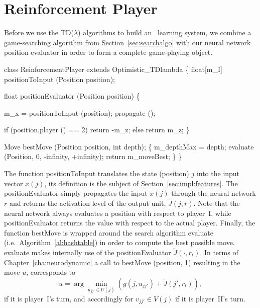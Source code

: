 \section{Reinforcement Player}
Before we use the TD($\lambda$) algorithms to build an \Abalone\ learning system, we combine a game-searching algorithm from Section~\ref{sec:searchalgo} with our neural network position evaluator in order to form a complete game-playing object.

\begin{algorithm} \label{al:reinplayer}
class ReinforcementPlayer extends Optimistic_TDlambda
\{
  float[m_I] positionToInput (Position position);

  float positionEvaluator (Position position)
  \{

    m_x = positionToInput (position); 
    propagate (); 

    if (position.player () == 2) return -m_z;
    else return m_z;
  \}

  Move bestMove (Position position, int depth);
  \{
    m_depthMax = depth;
    evaluate (Position, 0, -infinity, +infinity);
    return m_moveBest;
  \}
\}
\end{algorithm}
The function {\al positionToInput} translates the state (position) $j$ into the input vector $x(j)$, its definition is the subject of Section~\ref{sec:impl:features}. The {\al positionEvaluator} simply propagates the input $x(j)$ through the neural network $r$ and returns the activation level of the output unit, $\tilde J(j,r)$. Note that the neural network always evaluates a position with respect to player~I, while {\al positionEvaluator} returns the value with respect to the actual player. Finally, the function {\al bestMove} is wrapped around the search algorithm {\al evaluate} (i.e.~Algorithm~\ref{al:hashtable}) in order to compute the best possible move. {\al evaluate} makes internally use of the {\al positionEvaluator} $\tilde J(\cdot, r_t)$. In terms of Chapter~\ref{cha:neurodynamic} a call to {\al bestMove (position, 1)} resulting in the move $u$, corresponds to 
$$u = \arg \min_{u_{jj'} \in U(j)} \left ( g(j,u_{jj'}) + \tilde J(j', r_t) \right ),$$
if it is player~I's turn, and accordingly for $v_{jj'} \in V(j)$ if it is player~II's turn.

